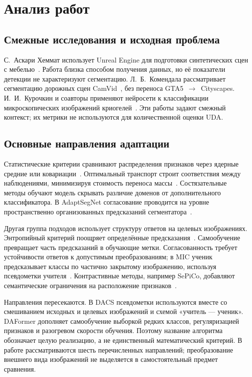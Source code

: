 \section{Анализ работ}
\subsection{Смежные исследования и исходная проблема}
С.~Аскари Хеммат использует Unreal Engine для подготовки синтетических сцен с мебелью~\cite{askari}. Работа близка способом получения данных, но её показатели детекции не характеризуют сегментацию. Л.~Б.~Комендала рассматривает сегментацию дорожных сцен CamVid~\cite{komendala}, без переноса GTA5~$\rightarrow$~Cityscapes. И.~И.~Курочкин и соавторы применяют нейросети к классификации микроскопических изображений криогелей~\cite{kurochkin}. Эти работы задают смежный контекст; их метрики не используются для количественной оценки UDA.

\subsection{Основные направления адаптации}
Статистические критерии сравнивают распределения признаков через ядерные средние или ковариации~\cite{mmd,coral}. Оптимальный транспорт строит соответствия между наблюдениями, минимизируя стоимость переноса массы~\cite{sinkhorn}. Состязательные методы обучают модель скрывать различие доменов от дополнительного классификатора. В AdaptSegNet согласование проводится на уровне пространственно организованных предсказаний сегментатора~\cite{tsai}.

Другая группа подходов использует структуру ответов на целевых изображениях. Энтропийный критерий поощряет определённые предсказания~\cite{advent}. Самообучение превращает часть предсказаний в обучающие метки. Согласованность требует устойчивости ответов к допустимым преобразованиям; в MIC ученик предсказывает классы по частично закрытому изображению, используя псевдометки учителя~\cite{mic}. Контрастивные методы, например SePiCo, добавляют семантические ограничения на расположение признаков~\cite{sepico}.

Направления пересекаются. В DACS псевдометки используются вместе со смешиванием исходных и целевых изображений и схемой «учитель --- ученик». DAFormer дополняет самообучение выборкой редких классов, регуляризацией признаков и разогревом скорости обучения. Поэтому название алгоритма обозначает целую реализацию, а не единственный математический критерий. В работе рассматриваются шесть перечисленных направлений; преобразование внешнего вида изображений не выделяется в самостоятельный предмет сравнения.

